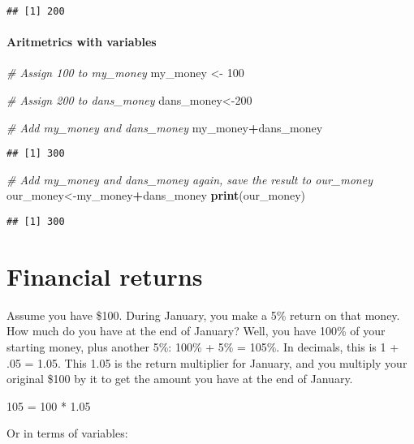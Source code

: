 \documentclass[]{article}
\newenvironment{Shaded}{\begin{snugshade}}{\end{snugshade}}
\newcommand{\KeywordTok}[1]{\textcolor[rgb]{0.13,0.29,0.53}{\textbf{#1}}}
\newcommand{\DecValTok}[1]{\textcolor[rgb]{0.00,0.00,0.81}{#1}}
\newcommand{\StringTok}[1]{\textcolor[rgb]{0.31,0.60,0.02}{#1}}
\newcommand{\CommentTok}[1]{\textcolor[rgb]{0.56,0.35,0.01}{\textit{#1}}}
\newcommand{\OperatorTok}[1]{\textcolor[rgb]{0.81,0.36,0.00}{\textbf{#1}}}
\newcommand{\NormalTok}[1]{#1}
\let\oldparagraph\paragraph
\renewcommand{\paragraph}[1]{\oldparagraph{#1}\mbox{}}
\begin{document}
\begin{verbatim}
## [1] 200
\end{verbatim}

\paragraph{Aritmetrics with variables}\label{aritmetrics-with-variables}

\begin{Shaded}
\begin{Highlighting}[]
\CommentTok{# Assign 100 to my_money}
\NormalTok{my_money <-}\StringTok{ }\DecValTok{100}

\CommentTok{# Assign 200 to dans_money}
\NormalTok{dans_money<-}\DecValTok{200}

\CommentTok{# Add my_money and dans_money}
\NormalTok{my_money}\OperatorTok{+}\NormalTok{dans_money}
\end{Highlighting}
\end{Shaded}

\begin{verbatim}
## [1] 300
\end{verbatim}

\begin{Shaded}
\begin{Highlighting}[]
\CommentTok{# Add my_money and dans_money again, save the result to our_money}
\NormalTok{our_money<-my_money}\OperatorTok{+}\NormalTok{dans_money}
\KeywordTok{print}\NormalTok{(our_money)}
\end{Highlighting}
\end{Shaded}

\begin{verbatim}
## [1] 300
\end{verbatim}

\section{Financial returns}\label{financial-returns}

Assume you have \$100. During January, you make a 5\% return on that
money. How much do you have at the end of January? Well, you have 100\%
of your starting money, plus another 5\%: 100\% + 5\% = 105\%. In
decimals, this is 1 + .05 = 1.05. This 1.05 is the return multiplier for
January, and you multiply your original \$100 by it to get the amount
you have at the end of January.

105 = 100 * 1.05

Or in terms of variables:
\end{document}
